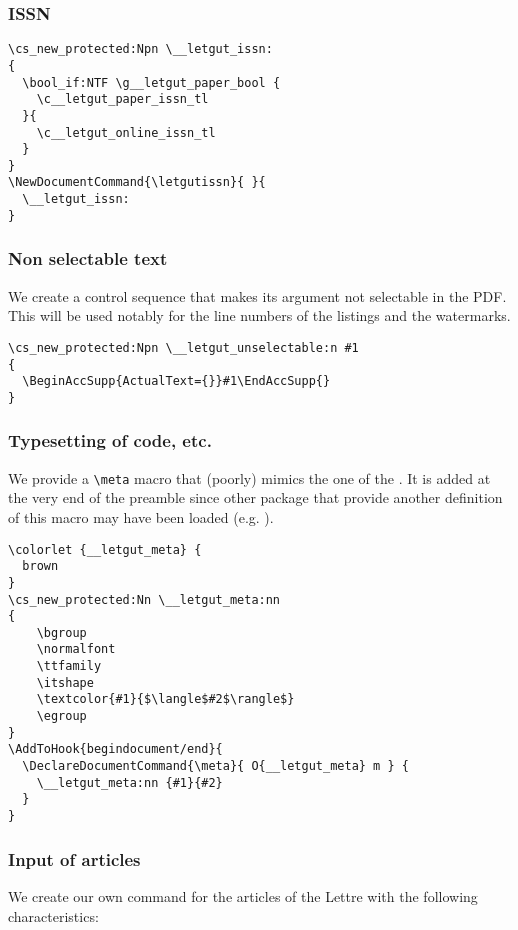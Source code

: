 \documentclass{letgut}
\begin{document}
\subsubsection{ISSN}
\label{ImplementationMiscellanousISSN-cr1h55h0jlj0}
\begin{lstlisting}
\cs_new_protected:Npn \__letgut_issn:
{
  \bool_if:NTF \g__letgut_paper_bool {
    \c__letgut_paper_issn_tl
  }{
    \c__letgut_online_issn_tl
  }
}
\NewDocumentCommand{\letgutissn}{ }{
  \__letgut_issn:
}
\end{lstlisting}

\subsubsection{Non selectable text}
\label{ImplementationMiscellanousNonselectabletext-wh2h55h0jlj0}
We create a control sequence that makes its argument not selectable in the
PDF. This will be used notably for the line numbers of the listings and the
watermarks.
\begin{lstlisting}
\cs_new_protected:Npn \__letgut_unselectable:n #1
{
  \BeginAccSupp{ActualText={}}#1\EndAccSupp{}
}
\end{lstlisting}

\subsubsection{Typesetting of code, etc.}
\label{ImplementationMiscellanousTypesettingofcodeetc-f83h55h0jlj0}
We provide a \lstinline+\meta+ macro that (poorly) mimics the one of the
. It is added at the very end of the preamble since other
package that provide another definition of this macro may have been loaded
(e.g. ).
\begin{lstlisting}
\colorlet {__letgut_meta} {
  brown
}
\cs_new_protected:Nn \__letgut_meta:nn
{
    \bgroup
    \normalfont
    \ttfamily
    \itshape
    \textcolor{#1}{$\langle$#2$\rangle$}
    \egroup
}
\AddToHook{begindocument/end}{
  \DeclareDocumentCommand{\meta}{ O{__letgut_meta} m } {
    \__letgut_meta:nn {#1}{#2}
  }
}
\end{lstlisting}

\subsubsection{Input of articles}
\label{ImplementationMiscellanousInputofarticles-aqok3ja00pj0}
We create our own \lstinline++ command for the articles of the Lettre with the
following characteristics:
\end{document}
